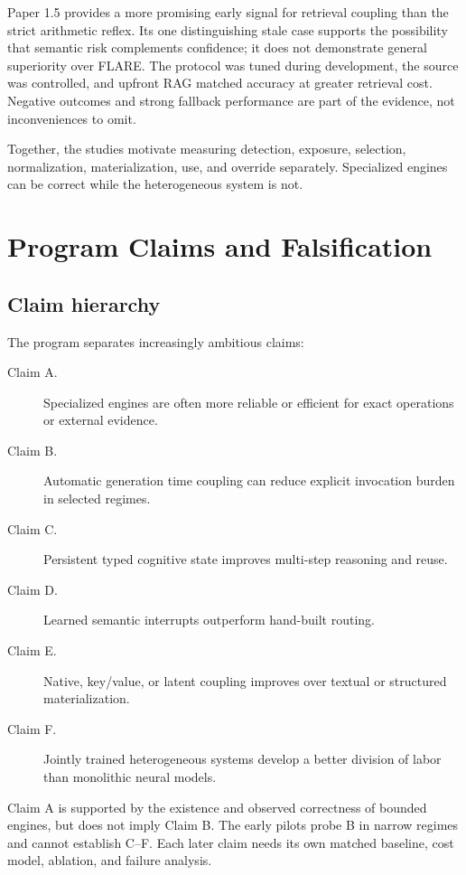 \documentclass[11pt]{article}
\begin{document}
Paper 1.5 provides a more promising early signal for retrieval coupling than
the strict arithmetic reflex.  Its one distinguishing stale case supports the
possibility that semantic risk complements confidence; it does not demonstrate
general superiority over FLARE.  The protocol was tuned during development,
the source was controlled, and upfront RAG matched accuracy at greater retrieval
cost.  Negative outcomes and strong fallback performance are part of the
evidence, not inconveniences to omit.

Together, the studies motivate measuring detection, exposure, selection,
normalization, materialization, use, and override separately.  Specialized
engines can be correct while the heterogeneous system is not.

\section{Program Claims and Falsification}

\subsection{Claim hierarchy}

The program separates increasingly ambitious claims:
\begin{description}
  \item[Claim A.] Specialized engines are often more reliable or efficient for
  exact operations or external evidence.
  \item[Claim B.] Automatic generation time coupling can reduce explicit
  invocation burden in selected regimes.
  \item[Claim C.] Persistent typed cognitive state improves multi-step
  reasoning and reuse.
  \item[Claim D.] Learned semantic interrupts outperform hand-built routing.
  \item[Claim E.] Native, key/value, or latent coupling improves over textual
  or structured materialization.
  \item[Claim F.] Jointly trained heterogeneous systems develop a better
  division of labor than monolithic neural models.
\end{description}

Claim A is supported by the existence and observed correctness of bounded
engines, but does not imply Claim B.  The early pilots probe B in narrow regimes
and cannot establish C--F.  Each later claim needs its own matched baseline,
cost model, ablation, and failure analysis.
\end{document}
